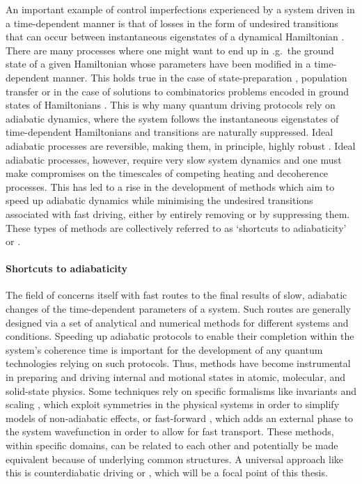 An important example of control imperfections experienced by a system driven in a time-dependent manner is that of losses in the form of undesired transitions that can occur between instantaneous eigenstates of a dynamical Hamiltonian \cite{berry_transitionless_2009, kolodrubetz_geometry_2017}. There are many processes where one might want to end up in \@e.g.~the ground state of a given Hamiltonian whose parameters have been modified in a time-dependent manner. This holds true in the case of state-preparation \cite{dimitrova_many-body_2023}, population transfer \cite{meier_counterdiabatic_2020} or in the case of solutions to combinatorics problems encoded in ground states of Hamiltonians \cite{pichler_quantum_2018, ebadi_quantum_2022}. This is why many quantum driving protocols rely on adiabatic dynamics, where the system follows the instantaneous eigenstates of time-dependent Hamiltonians and transitions are naturally suppressed\cite{born_beweis_1928, kato_adiabatic_1950}. Ideal adiabatic processes are reversible, making them, in principle, highly robust \cite{jarzynski_geometric_1995, kolodrubetz_geometry_2017}. Ideal adiabatic processes, however, require very slow system dynamics and one must make compromises on the timescales of competing heating and decoherence processes. This has led to a rise in the development of methods which aim to speed up adiabatic dynamics while minimising the undesired transitions associated with fast driving, either by entirely removing or by suppressing them. These types of methods are collectively referred to as `shortcuts to adiabaticity' or  \cite{guery-odelin_shortcuts_2019, torrontegui_chapter_2013}. 

\paragraph*{Shortcuts to adiabaticity} 

The field of  concerns itself with fast routes to the final results of slow, adiabatic changes of the time-dependent parameters of a system. Such routes are generally designed via a set of analytical and numerical methods for different systems and conditions. Speeding up adiabatic protocols to enable their completion within the system’s coherence time is important
for the development of any quantum technologies relying on such protocols. Thus,  methods have become instrumental in preparing and driving internal and motional states in atomic, molecular, and solid-state physics. Some  techniques rely on specific formalisms like invariants and scaling \cite{deffner_classical_2014, deng_superadiabatic_2018, chen_fast_2010}, which exploit symmetries in the physical systems in order to simplify models of non-adiabatic effects, or fast-forward \cite{masuda_fast-forward_2009, masuda_fast-forward_2008}, which adds an external phase to the system wavefunction in order to allow for fast transport. These methods, within specific domains, can be related to each other and potentially be made equivalent because of underlying common structures. A universal  approach like this is counterdiabatic driving or , which will be a focal point of this thesis. 

